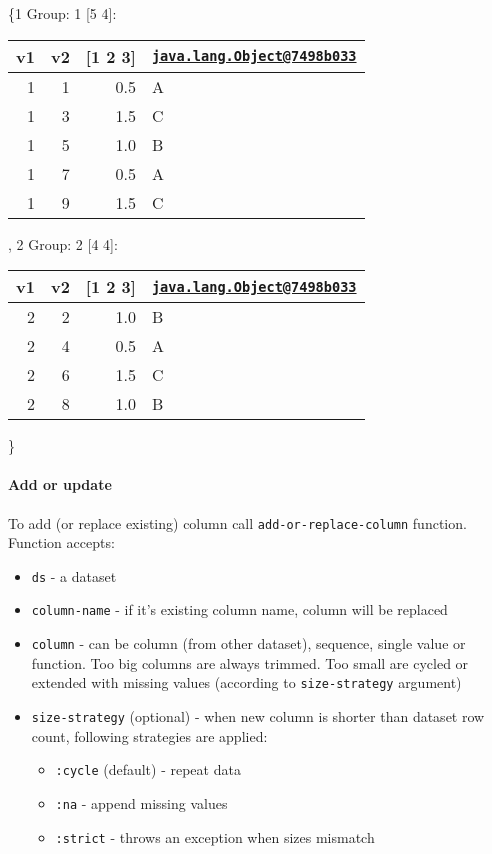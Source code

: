 \documentclass[]{article}
\providecommand{\tightlist}{%
  \setlength{\itemsep}{0pt}\setlength{\parskip}{0pt}}
\let\oldparagraph\paragraph
\renewcommand{\paragraph}[1]{\oldparagraph{#1}\mbox{}}
\begin{document}
\{1 Group: 1 {[}5 4{]}:

\begin{longtable}[]{@{}rrrl@{}}
\toprule
v1 & v2 & {[}1 2 3{]} &
\href{mailto:java.lang.Object@7498b033}{\nolinkurl{java.lang.Object@7498b033}}\tabularnewline
\midrule
\endhead
1 & 1 & 0.5 & A\tabularnewline
1 & 3 & 1.5 & C\tabularnewline
1 & 5 & 1.0 & B\tabularnewline
1 & 7 & 0.5 & A\tabularnewline
1 & 9 & 1.5 & C\tabularnewline
\bottomrule
\end{longtable}

, 2 Group: 2 {[}4 4{]}:

\begin{longtable}[]{@{}rrrl@{}}
\toprule
v1 & v2 & {[}1 2 3{]} &
\href{mailto:java.lang.Object@7498b033}{\nolinkurl{java.lang.Object@7498b033}}\tabularnewline
\midrule
\endhead
2 & 2 & 1.0 & B\tabularnewline
2 & 4 & 0.5 & A\tabularnewline
2 & 6 & 1.5 & C\tabularnewline
2 & 8 & 1.0 & B\tabularnewline
\bottomrule
\end{longtable}

\}

\paragraph{Add or update}\label{add-or-update}

To add (or replace existing) column call \texttt{add-or-replace-column}
function. Function accepts:

\begin{itemize}
\tightlist
\item
  \texttt{ds} - a dataset
\item
  \texttt{column-name} - if it's existing column name, column will be
  replaced
\item
  \texttt{column} - can be column (from other dataset), sequence, single
  value or function. Too big columns are always trimmed. Too small are
  cycled or extended with missing values (according to
  \texttt{size-strategy} argument)
\item
  \texttt{size-strategy} (optional) - when new column is shorter than
  dataset row count, following strategies are applied:

  \begin{itemize}
  \tightlist
  \item
    \texttt{:cycle} (default) - repeat data
  \item
    \texttt{:na} - append missing values
  \item
    \texttt{:strict} - throws an exception when sizes mismatch
  \end{itemize}
\end{itemize}
\end{document}
